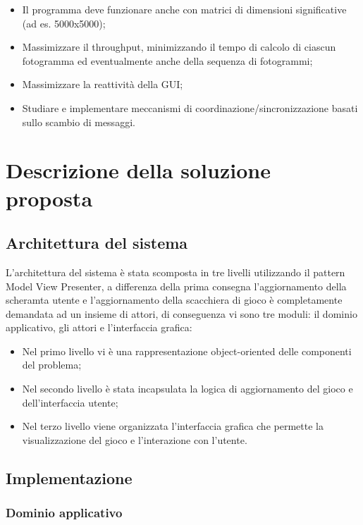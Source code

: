 \documentclass[a4paper]{article}
\begin{document}
\begin{itemize}
\item
  Il programma deve funzionare anche con matrici di dimensioni significative (ad es. 5000x5000);
\item
  Massimizzare il throughput, minimizzando il tempo di calcolo di ciascun fotogramma ed eventualmente anche della sequenza di fotogrammi;
\item
  Massimizzare la reattività della GUI;
\item
  Studiare e implementare meccanismi di coordinazione/sincronizzazione basati sullo scambio di messaggi.
\end{itemize}

\section{Descrizione della soluzione proposta}\label{descrizione-della-soluzione-proposta}

\subsection{Architettura del sistema}\label{architettura-del-sistema}

L'architettura del sistema è stata scomposta in tre livelli utilizzando il pattern Model View Presenter, a differenza della prima consegna l'aggiornamento della scheramta utente e l'aggiornamento della scacchiera di gioco è completamente demandata ad un insieme di attori, di conseguenza vi sono tre moduli: il dominio applicativo, gli attori e l'interfaccia grafica:

\begin{itemize}
\item
  Nel primo livello vi è una rappresentazione object-oriented delle componenti del problema;
\item
  Nel secondo livello è stata incapsulata la logica di aggiornamento del gioco e dell'interfaccia utente;
\item
  Nel terzo livello viene organizzata l'interfaccia grafica che permette la visualizzazione del gioco e l'interazione con l'utente.
\end{itemize}

\subsection{Implementazione}\label{implementazione}

\subsubsection{Dominio applicativo}\label{dominio-applicativo}
\end{document}
